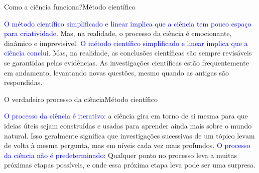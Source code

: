 \documentclass[t]{beamer}
\begin{document}

\begin{ftst}{Como a ciência funciona?}{Método científico}
\justifying
\small

\textcolor{blue}{O método científico simplificado e linear implica que a ciência tem pouco espaço para criatividade.}
\vone
Mas, na realidade, o processo da ciência é emocionante, dinâmico e imprevisível. 
\vone
\vone
\textcolor{blue}{O método científico simplificado e linear implica que a ciência conclui.}
\vone
Mas, na realidade, as conclusões científicas são sempre revisáveis se garantidas pelas evidências. As investigações científicas estão frequentemente em andamento, levantando novas questões, mesmo quando as antigas são respondidas.
\end{ftst}



\begin{ftst}{O verdadeiro processo da ciência}{Método científico}
\justifying
\small

\textcolor{blue}{O processo da ciência é iterativo:}
\vone
a ciência gira em torno de si mesma para que ideias úteis sejam construídas e usadas para aprender ainda mais sobre o mundo natural. Isso geralmente significa que investigações sucessivas de um tópico levam de volta à mesma pergunta, mas em níveis cada vez mais profundos.
\vone
\vone
\textcolor{blue}{O processo da ciência não é predeterminado:}
\vone
Qualquer ponto no processo leva a muitas próximas etapas possíveis, e onde essa próxima etapa leva pode ser uma surpresa.

\end{ftst}

\end{document}
